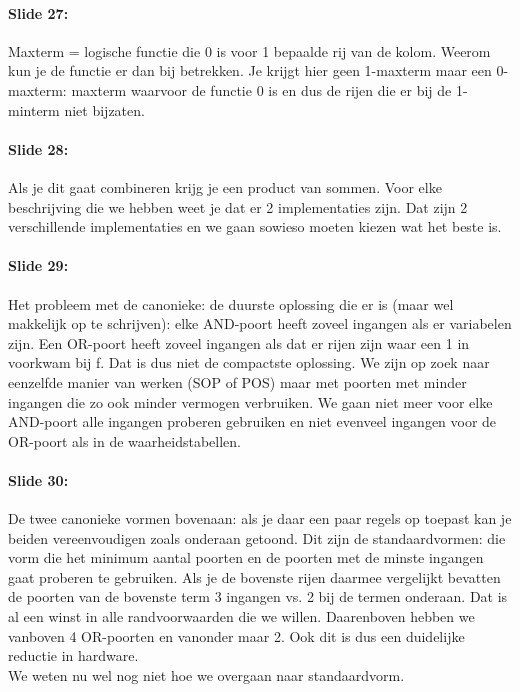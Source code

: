 \documentclass[10pt,a4paper]{book}
\begin{document}
\paragraph{Slide 27:} Maxterm = logische functie die 0 is voor 1 bepaalde rij van de kolom. Weerom kun je de functie er dan bij betrekken. Je krijgt hier geen 1-maxterm maar een 0-maxterm: maxterm waarvoor de functie 0 is en dus de rijen die er bij de 1-minterm niet bijzaten.

\paragraph{Slide 28:} Als je dit gaat combineren krijg je een product van sommen. Voor elke beschrijving die we hebben weet je dat er 2 implementaties zijn. Dat zijn 2 verschillende implementaties en we gaan sowieso moeten kiezen wat het beste is.

\paragraph{Slide 29:} Het probleem met de canonieke: de duurste oplossing die er is (maar wel makkelijk op te schrijven): elke AND-poort heeft zoveel ingangen als er variabelen zijn. Een OR-poort heeft zoveel ingangen als dat er rijen zijn waar een 1 in voorkwam bij f. Dat is dus niet de compactste oplossing. We zijn op zoek naar eenzelfde manier van werken (SOP of POS) maar met poorten met minder ingangen die zo ook minder vermogen verbruiken. We gaan niet meer voor elke AND-poort alle ingangen proberen gebruiken en niet evenveel ingangen voor de OR-poort als in de waarheidstabellen.

\paragraph{Slide 30:} De twee canonieke vormen bovenaan: als je daar een paar regels op toepast kan je beiden vereenvoudigen zoals onderaan getoond. Dit zijn de standaardvormen: die vorm die het minimum aantal poorten en de poorten met de minste ingangen gaat proberen te gebruiken. Als je de bovenste rijen daarmee vergelijkt bevatten de poorten van de bovenste term 3 ingangen vs. 2 bij de termen onderaan. Dat is al een winst in alle randvoorwaarden die we willen. Daarenboven hebben we vanboven 4 OR-poorten en vanonder maar 2. Ook dit is dus een duidelijke reductie in hardware.\\
We weten nu wel nog niet hoe we overgaan naar standaardvorm.
\end{document}
